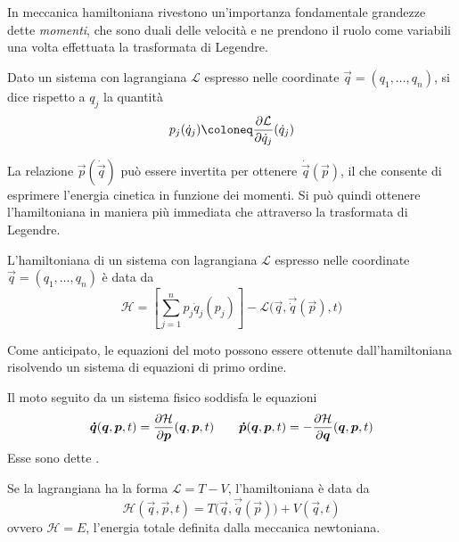 In meccanica hamiltoniana rivestono un'importanza fondamentale grandezze dette \emph{momenti}, che sono duali delle velocità e ne prendono il ruolo come variabili una volta effettuata la trasformata di Legendre.
\begin{definition}
  Dato un sistema con lagrangiana $\mathcal{L}$ espresso nelle coordinate $\vec{q}=(q_1, \ldots, q_n)$, si dice  rispetto a $q_j$ la quantità \begin{equation}
  p_j(\dot{q}_j) \defeq \pdv{\mathcal{L}}{\dot{q}_j}() (\dot{q}_j)
  \end{equation} 
\end{definition}

La relazione $\vec{p}(\dot{\vec{q}})$ può essere invertita per ottenere $\dot{\vec{q}}(\vec{p})$, il che consente di esprimere l'energia cinetica in funzione dei momenti. Si può quindi ottenere l'hamiltoniana in maniera più immediata che attraverso la trasformata di Legendre.
\begin{theorem}
  L'hamiltoniana di un sistema con lagrangiana $\mathcal{L}$ espresso nelle coordinate $\vec{q}=(q_1, \ldots, q_n)$ è data da \begin{equation}
  \mathcal{H} = \left[\sum_{j=1}^{n} p_j \dot{q}_j (p_j)\right] - \mathcal{L}\big(\vec{q}, \vec{\dot{q}}(\vec{p}), t\big)
  \end{equation} 
\end{theorem}

Come anticipato, le equazioni del moto possono essere ottenute dall'hamiltoniana risolvendo un sistema di equazioni di primo ordine.
\begin{theorem}
  Il moto seguito da un sistema fisico soddisfa le equazioni \begin{equation}
  \boldsymbol{\dot{q}}(\boldsymbol{q},\boldsymbol{p},t) = \pdv{\mathcal{H}}{\boldsymbol{p}}()(\boldsymbol{q},\boldsymbol{p},t) \qquad \boldsymbol{\dot{p}}(\boldsymbol{q},\boldsymbol{p},t) = -\pdv{\mathcal{H}}{\boldsymbol{q}}()(\boldsymbol{q},\boldsymbol{p},t)
  \end{equation}
  Esse sono dette .
\end{theorem}

\begin{theorem}
  Se la lagrangiana ha la forma $\mathcal{L} = T - V$, l'hamiltoniana è data da \begin{equation}
  \mathcal{H}(\vec{q},\vec{p},t) = T\big(\vec{q},\vec{\dot{q}}(\vec{p})\big) + V(\vec{q},t)
  \end{equation} 
  ovvero $\mathcal{H} = E$, l'energia totale definita dalla meccanica newtoniana.
\end{theorem}

